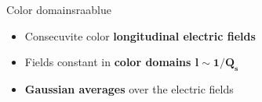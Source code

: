 \documentclass[aspectratio=169,11pt,usenames,dvipsnames]{beamer}
\begin{document}
\begin{frame}
\begin{center}
\begin{columns}[onlytextwidth,t]
            \begin{center}
                \begin{custombox2}{\normalsize Color domains}{raablue}
                    \small
                    \begin{varwidth}{0.89\textwidth}
                    \begin{itemize}\itemsep0em 
                        \itemsep0em
                        \footnotesize
                        \item Consecuvite color {\bfseries\color{raablue}longitudinal electric fields}
                        \item Fields constant in {\bfseries\color{jyured}color domains $\boldsymbol{l\sim 1/Q_s}$}
                        \item {\bfseries\color{raablue} Gaussian averages} over the electric fields
                    \end{itemize}
                    \end{varwidth}
                \end{custombox2}

\end{center}
\end{columns}
\end{center}
\end{frame}
\end{document}
